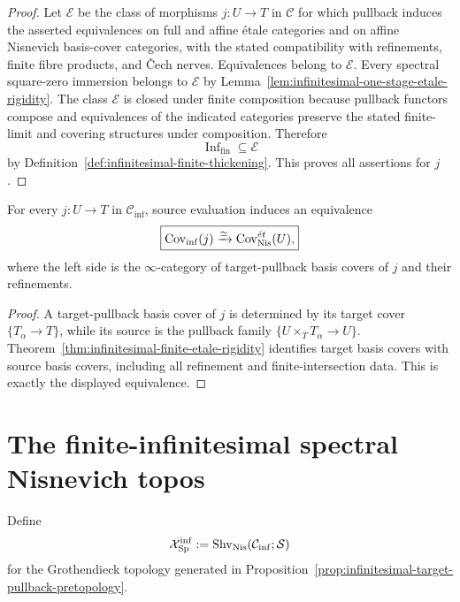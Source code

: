 \begin{proof}
Let \(\mathcal E\) be the class of morphisms \(j:U\to T\) in \(\mathcal C\)
for which pullback induces the asserted equivalences on full and affine
\'etale categories and on affine Nisnevich basis-cover categories, with the
stated compatibility with refinements, finite fibre products, and
\v{C}ech nerves.  Equivalences belong to \(\mathcal E\).  Every spectral
square-zero immersion belongs to \(\mathcal E\) by
Lemma~\ref{lem:infinitesimal-one-stage-etale-rigidity}.  The class
\(\mathcal E\) is closed under finite composition because pullback functors
compose and equivalences of the indicated categories preserve the stated
finite-limit and covering structures under composition.  Therefore
\[
    \operatorname{Inf}_{\mathrm{fin}}\subseteq\mathcal E
\]
by Definition~\ref{def:infinitesimal-finite-thickening}.  This proves all
assertions for \(j\).
\end{proof}

\begin{corollary}
\label{cor:infinitesimal-source-cover-classification}
For every $j:U\to T$ in $\mathcal C_{\mathrm{inf}}$, source evaluation induces
an equivalence
\[
    \boxed{
    \operatorname{Cov}_{\mathrm{inf}}(j)
    \xrightarrow{\simeq}
    \operatorname{Cov}^{\acute et}_{\mathrm{Nis}}(U),
    }
\]
where the left side is the $\infty$-category of target-pullback basis covers
of $j$ and their refinements.
\end{corollary}

\begin{proof}
A target-pullback basis cover of $j$ is determined by its target cover
$\{T_\alpha\to T\}$, while its source is the pullback family
$\{U\times_TT_\alpha\to U\}$.  Theorem~\ref{thm:infinitesimal-finite-etale-rigidity}
identifies target basis covers with source basis covers, including all
refinement and finite-intersection data.  This is exactly the displayed
equivalence.
\end{proof}

\section{The finite-infinitesimal spectral Nisnevich topos}
\label{sec:infinitesimal-topos}

Define
\[
    \mathcal X_{\mathrm{Sp}}^{\mathrm{inf}}
    :=
    \operatorname{Shv}_{\mathrm{Nis}}
    (\mathcal C_{\mathrm{inf}};\mathcal S)
\]
for the Grothendieck topology generated in
Proposition~\ref{prop:infinitesimal-target-pullback-pretopology}.

